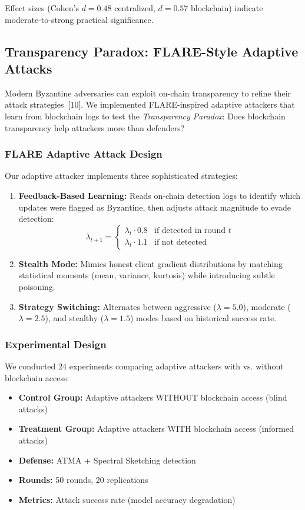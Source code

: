 \documentclass[12pt,a4paper,onecolumn]{article}
\begin{document}
Effect sizes (Cohen's $d=0.48$ centralized, $d=0.57$ blockchain) indicate moderate-to-strong practical significance.

\subsection{Transparency Paradox: FLARE-Style Adaptive Attacks}

Modern Byzantine adversaries can exploit on-chain transparency to refine their attack strategies~[10]. We implemented FLARE-inspired adaptive attackers that learn from blockchain logs to test the \emph{Transparency Paradox}: Does blockchain transparency help attackers more than defenders?

\subsubsection{FLARE Adaptive Attack Design}

Our adaptive attacker implements three sophisticated strategies:

\begin{enumerate}
    \item \textbf{Feedback-Based Learning:} Reads on-chain detection logs to identify which updates were flagged as Byzantine, then adjusts attack magnitude to evade detection:
    $$\lambda_{t+1} = \begin{cases}
    \lambda_t \cdot 0.8 & \text{if detected in round } t \\
    \lambda_t \cdot 1.1 & \text{if not detected}
    \end{cases}$$
    
    \item \textbf{Stealth Mode:} Mimics honest client gradient distributions by matching statistical moments (mean, variance, kurtosis) while introducing subtle poisoning.
    
    \item \textbf{Strategy Switching:} Alternates between aggressive ($\lambda=5.0$), moderate ($\lambda=2.5$), and stealthy ($\lambda=1.5$) modes based on historical success rate.
\end{enumerate}

\subsubsection{Experimental Design}

We conducted 24 experiments comparing adaptive attackers with vs. without blockchain access:
\begin{itemize}
    \item \textbf{Control Group:} Adaptive attackers WITHOUT blockchain access (blind attacks)
    \item \textbf{Treatment Group:} Adaptive attackers WITH blockchain access (informed attacks)
    \item \textbf{Defense:} ATMA + Spectral Sketching detection
    \item \textbf{Rounds:} 50 rounds, 20 replications
    \item \textbf{Metrics:} Attack success rate (model accuracy degradation)
\end{itemize}
\end{document}
